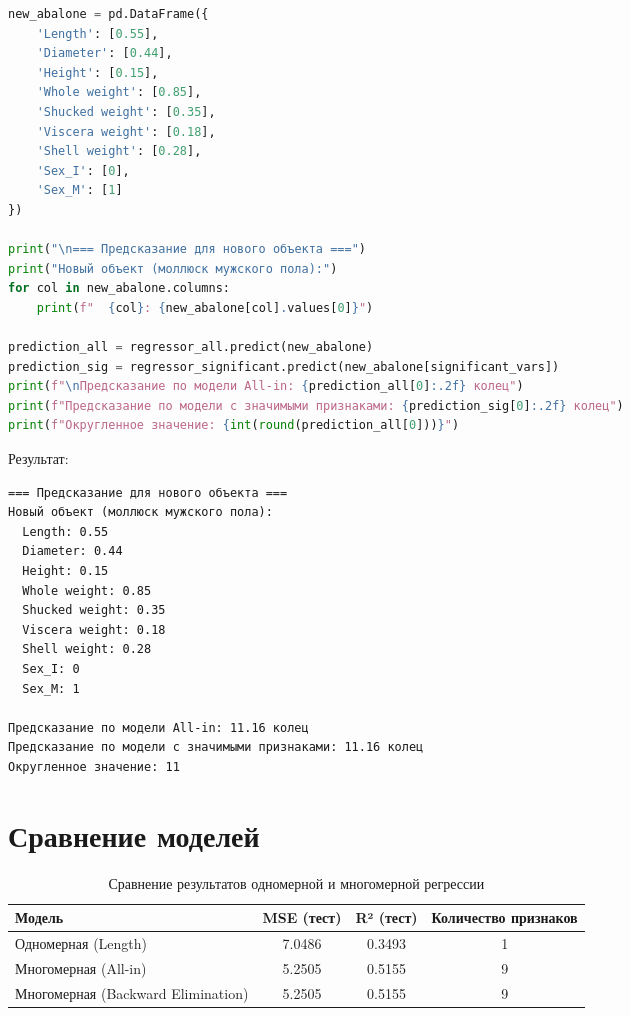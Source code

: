 \begin{lstlisting}[language=Python, caption=Предсказание для нового объекта]
new_abalone = pd.DataFrame({
    'Length': [0.55],
    'Diameter': [0.44],
    'Height': [0.15],
    'Whole weight': [0.85],
    'Shucked weight': [0.35],
    'Viscera weight': [0.18],
    'Shell weight': [0.28],
    'Sex_I': [0],
    'Sex_M': [1]
})

print("\n=== Предсказание для нового объекта ===")
print("Новый объект (моллюск мужского пола):")
for col in new_abalone.columns:
    print(f"  {col}: {new_abalone[col].values[0]}")

prediction_all = regressor_all.predict(new_abalone)
prediction_sig = regressor_significant.predict(new_abalone[significant_vars])
print(f"\nПредсказание по модели All-in: {prediction_all[0]:.2f} колец")
print(f"Предсказание по модели с значимыми признаками: {prediction_sig[0]:.2f} колец")
print(f"Округленное значение: {int(round(prediction_all[0]))}")
\end{lstlisting}

Результат:

\begin{verbatim}
=== Предсказание для нового объекта ===
Новый объект (моллюск мужского пола):
  Length: 0.55
  Diameter: 0.44
  Height: 0.15
  Whole weight: 0.85
  Shucked weight: 0.35
  Viscera weight: 0.18
  Shell weight: 0.28
  Sex_I: 0
  Sex_M: 1

Предсказание по модели All-in: 11.16 колец
Предсказание по модели с значимыми признаками: 11.16 колец
Округленное значение: 11
\end{verbatim}

\section{Сравнение моделей}

\begin{table}[h]
\centering
\caption{Сравнение результатов одномерной и многомерной регрессии}
\label{tab:model_comparison}
\begin{tabular}{|l|c|c|c|}
\hline
\textbf{Модель} & \textbf{MSE (тест)} & \textbf{R² (тест)} & \textbf{Количество признаков} \\
\hline
Одномерная (Length) & 7.0486 & 0.3493 & 1 \\
Многомерная (All-in) & 5.2505 & 0.5155 & 9 \\
Многомерная (Backward Elimination) & 5.2505 & 0.5155 & 9 \\
\hline
\end{tabular}
\end{table}


